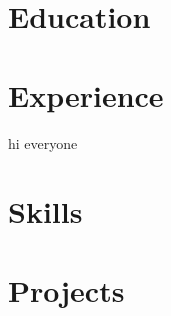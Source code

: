 \documentclass[11pt]{article}
\begin{document}


\section*{Education}


\section*{Experience}

hi everyone
% 

\section*{Skills}


\section*{Projects}
% 
\end{document}
